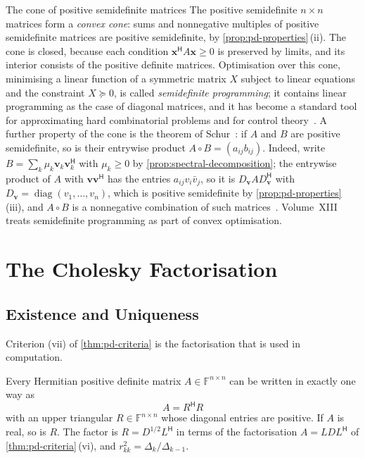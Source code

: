 \begin{note}{The cone of positive semidefinite matrices}
The positive semidefinite $n\times n$ matrices form a \emph{convex cone}: sums and nonnegative multiples of positive semidefinite matrices are positive semidefinite, by \cref{prop:pd-properties}\,(ii). The cone is closed, because each condition $\mathbf x^{\mathsf H}A\mathbf x\ge0$ is preserved by limits, and its interior consists of the positive definite matrices. Optimisation over this cone, minimising a linear function of a symmetric matrix $X$ subject to linear equations and the constraint $X\succeq0$, is called \emph{semidefinite programming}; it contains linear programming as the case of diagonal matrices, and it has become a standard tool for approximating hard combinatorial problems and for control theory~\cite{vandenberghe1996}. A further property of the cone is the theorem of Schur~\cite{schur1911}: if $A$ and $B$ are positive semidefinite, so is their entrywise product $A\circ B=(a_{ij}b_{ij})$. Indeed, write $B=\sum_k\mu_k\mathbf v_k\mathbf v_k^{\mathsf H}$ with $\mu_k\ge0$ by \cref{prop:spectral-decomposition}; the entrywise product of $A$ with $\mathbf v\mathbf v^{\mathsf H}$ has the entries $a_{ij}v_i\bar v_j$, so it is $D_{\mathbf v}AD_{\mathbf v}^{\mathsf H}$ with $D_{\mathbf v}=\operatorname{diag}(v_1,\ldots,v_n)$, which is positive semidefinite by \cref{prop:pd-properties}\,(iii), and $A\circ B$ is a nonnegative combination of such matrices~\cite[Sect.~7.5]{horn2013}. Volume~XIII treats semidefinite programming as part of convex optimisation.
\end{note}

\section{The Cholesky Factorisation}
\label{sec:cholesky}

\subsection{Existence and Uniqueness}

Criterion (vii) of \cref{thm:pd-criteria} is the factorisation that is used in computation.

\begin{theorem}
\label{thm:cholesky}
Every Hermitian positive definite matrix $A\in\mathbb F^{n\times n}$ can be written in exactly one way as
\[
A=R^{\mathsf H}R
\]
with an upper triangular $R\in\mathbb F^{n\times n}$ whose diagonal entries are positive. If $A$ is real, so is $R$. The factor is $R=D^{1/2}L^{\mathsf H}$ in terms of the factorisation $A=LDL^{\mathsf H}$ of \cref{thm:pd-criteria}\,(vi), and $r_{kk}^2=\Delta_k/\Delta_{k-1}$.
\end{theorem}

